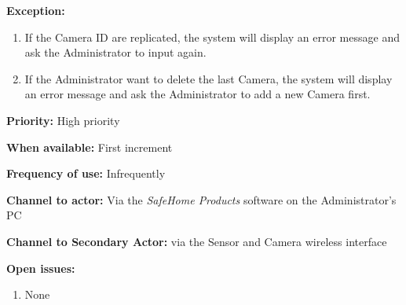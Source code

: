 \documentclass[twoside,11pt]{article}
\begin{document}
\begin{center}
{{\begin{multicols}{2}
                \textbf{Exception:}

                \begin{enumerate}
                    \item If the Camera ID are replicated, the system will display an error message and ask the Administrator to input again.
                    \item If the Administrator want to delete the last Camera, the system will display an error message and ask the Administrator to add a new Camera first.
                \end{enumerate}

                \textbf{Priority:} High priority

                \textbf{When available:} First increment

                \textbf{Frequency of use:} Infrequently

                \textbf{Channel to actor:} Via the \emph{SafeHome Products} software on the Administrator's PC

                \textbf{Channel to Secondary Actor:} via the Sensor and Camera wireless interface

                \textbf{Open issues:}

                \begin{enumerate}
                    \item None
                \end{enumerate}

            \end{multicols}}}
\end{center}
\newpage
\end{document}
